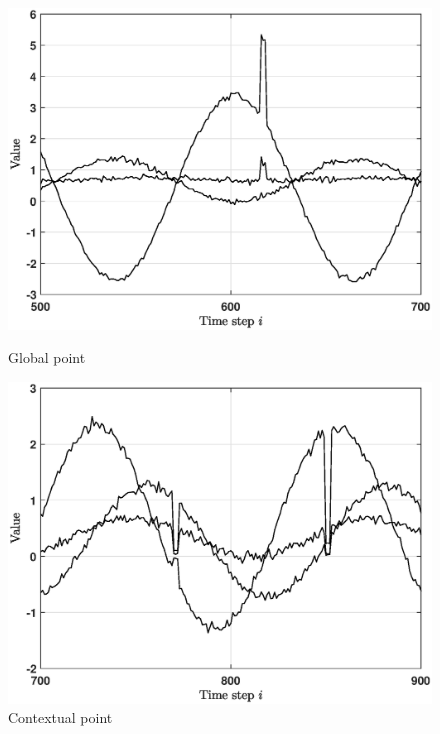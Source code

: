 \begin{figure}[h]
	\begin{minipage}{0.333\textwidth}
		\centering
		\includegraphics[scale=0.27]{analysis/Example_timeseries_point_frac}
		\caption{Global point}
		\label{fig:analysis_point}
	\end{minipage}
	\begin{minipage}{0.333\textwidth}
		\centering
		\includegraphics[scale=0.27]{analysis/Example_timeseries_contextual_frac}
		\caption{Contextual point}
		\label{fig:analysis_contextual}
	\end{minipage}
	\begin{minipage}{0.333\textwidth}
		\centering

\end{minipage}
\end{figure}
